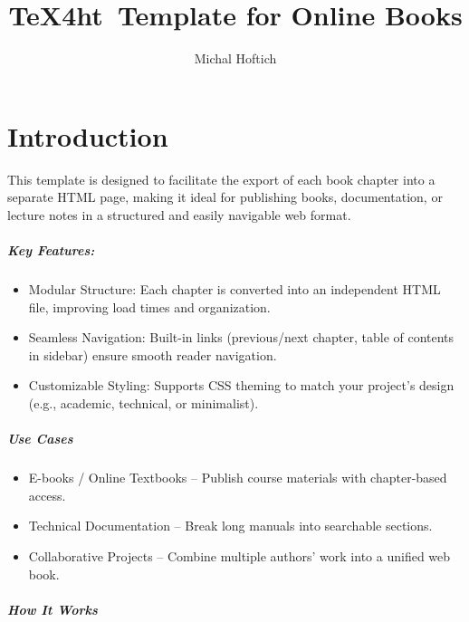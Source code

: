 \documentclass{book}
\begin{document}
\title{\TeX4ht\ Template for Online Books}
\author{Michal Hoftich}
\maketitle
\tableofcontents

\chapter{Introduction}

This template is designed to facilitate the export of each book chapter into a
separate HTML page, making it ideal for publishing books, documentation, or
lecture notes in a structured and easily navigable web format.

\paragraph{Key Features:}

\begin{itemize}
  \item Modular Structure: Each chapter is converted into an independent HTML
    file, improving load times and organization.

  \item Seamless Navigation: Built-in links (previous/next chapter, table of contents in sidebar) ensure smooth reader navigation.

  \item Customizable Styling: Supports CSS theming to match your project’s design (e.g., academic, technical, or minimalist).
\end{itemize}

\paragraph{Use Cases}

\begin{itemize}
  \item E-books / Online Textbooks – Publish course materials with chapter-based access.

  \item Technical Documentation – Break long manuals into searchable sections.

  \item Collaborative Projects – Combine multiple authors’ work into a unified web book.
\end{itemize}

\paragraph{How It Works}
\end{document}
